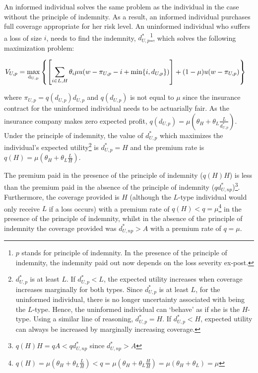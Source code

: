 \documentclass[nonatbib,preprint,12pt]{elsarticle}
\theoremstyle{plain}
\theoremstyle{definition}
\theoremstyle{plain}
\theoremstyle{TheoremNum}
\theoremstyle{CorollaryNum}
\theoremstyle{PropositionNum}
\theoremstyle{TheoremNum}
\begin{document}
An informed individual solves the same problem as the individual in the case without the principle of indemnity. As a result, an informed individual purchases full coverage appropriate for her risk level. An uninformed individual who suffers a loss of size $i$, needs to find the indemnity, $d_{U,p}^*$\footnote{$p$ stands for principle of indemnity. In the presence of the principle of indemnity, the indemnity paid out now depends on the loss severity ex-post.}, which solves the following maximization problem:

\begin{align}
V_{U,p} = \underset{\rm d_{U,p}}{\rm max } & \left\{\left[\sum_{i \in {L,H}} \theta_i \mu u(w-\pi_{U,p}-i+\text{min}\{i,d_{U,p}\})\right] + (1-\mu)u(w-\pi_{U,p})\right\}
\label{uninformed_p_maxproblem}
\end{align}

where $\pi_{U,p} = q(d_{U,p})d_{U,p}$ and  $q(d_{U,p})$ is not equal to $\mu$ since the insurance contract for the uninformed individual needs to be actuarially fair. As the insurance company makes zero expected profit, $q(d_{U,p}) = \mu (\theta_H + \theta_L \frac{L}{d_{U,p}^*})$. Under the principle of indemnity, the value of $d_{U,p}^*$ which maximizes the individual's expected utility\footnote{$d_{U,p}^*$ is at least $L$. If $d_{U,p}^*<L$, the expected utility increases when coverage increases marginally for both types. Since $d_{U,p}^*$ is at least $L$, for the uninformed individual, there is no longer uncertainty associated with being the $L$-type. Hence, the uninformed individual can `behave' as if she is the $H$-type. Using a similar line of reasoning, $d_{U,p}^* = H$. If $d_{U,p}^*<H$, expected utility can always be increased by marginally increasing coverage.} is $d_{U,p}^*=H$ and the premium rate is $q(H) = \mu (\theta_H + \theta_L \frac{L}{H})$. 

The premium paid in the presence of the principle of indemnity ($q(H) H$) is less than the premium paid in the absence of the principle of indemnity ($q d_{U,np}^*$)\footnote{$q(H) H = q A < q d_{U,np}^*$ since $d_{U,np}^* > A$}. Furthermore, the coverage provided is $H$ (although the $L$-type individual would only receive $L$ if a loss occurs) with a premium rate of $q(H) < q = \mu$\footnote{$q(H) = \mu (\theta_H + \theta_L \frac{L}{H}) < q = \mu (\theta_H + \theta_L \frac{H}{H}) = \mu (\theta_H + \theta_L) = \mu$} in the presence of the principle of indemnity, whilst in the absence of the principle of indemnity the coverage provided was $d_{U,np}^* > A$ with a premium rate of $q=\mu$. 
\end{document}
